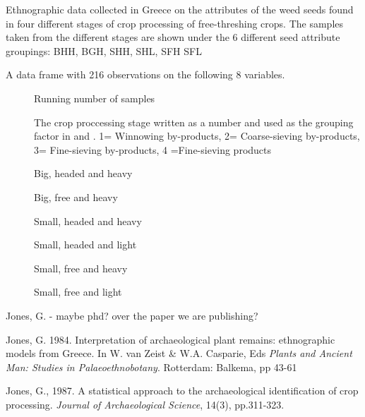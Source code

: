 \documentclass[a4paper]{book}
\begin{document}
%
\begin{Description}\relax
 Ethnographic data collected in Greece on the attributes of the weed seeds found in four different stages of crop processing of free-threshing crops. The samples taken from the different stages are shown under the 6 different seed attribute groupings: BHH, BGH, SHH, SHL, SFH SFL

\end{Description}
%
\begin{Format}
A data frame with 216 observations on the following 8 variables.
\begin{description}

\item[] Running number of samples
\item[] The crop proccessing stage written as a number and used as the grouping factor in  and . 1= Winnowing by-products, 2= Coarse-sieving by-products, 3= Fine-sieving by-products, 4 =Fine-sieving products
\item[] Big, headed and heavy
\item[] Big, free and heavy
\item[] Small, headed and heavy
\item[] Small, headed and light
\item[] Small, free and heavy
\item[] Small, free and light

\end{description}

\end{Format}
%
\begin{Source}\relax
Jones, G. - maybe phd? over the paper we are publishing?

\end{Source}
%
\begin{References}\relax
Jones, G. 1984. Interpretation of archaeological plant remains: ethnographic models from Greece. In W. van Zeist \& W.A. Casparie, Eds \emph{Plants and Ancient Man: Studies in Palaeoethnobotany}. Rotterdam: Balkema, pp 43-61

Jones, G., 1987. A statistical approach to the archaeological identification of crop processing. \emph{Journal of Archaeological Science}, 14(3), pp.311-323.

\end{References}
\end{document}
